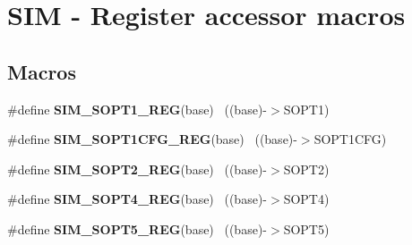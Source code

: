 \hypertarget{group___s_i_m___register___accessor___macros}{}\section{S\+I\+M -\/ Register accessor macros}
\label{group___s_i_m___register___accessor___macros}
\subsection*{Macros}
\begin{DoxyCompactItemize}
\item 
\hypertarget{group___s_i_m___register___accessor___macros_ga4fb13e9e7e8bf019daf19284be9b0a73}{}\#define {\bfseries S\+I\+M\+\_\+\+S\+O\+P\+T1\+\_\+\+R\+E\+G}(base)                                        ~((base)-\/$>$S\+O\+P\+T1)\label{group___s_i_m___register___accessor___macros_ga4fb13e9e7e8bf019daf19284be9b0a73}

\item 
\hypertarget{group___s_i_m___register___accessor___macros_ga2eac749528469c06ed7ac6d54070fdbd}{}\#define {\bfseries S\+I\+M\+\_\+\+S\+O\+P\+T1\+C\+F\+G\+\_\+\+R\+E\+G}(base)                                  ~((base)-\/$>$S\+O\+P\+T1\+C\+F\+G)\label{group___s_i_m___register___accessor___macros_ga2eac749528469c06ed7ac6d54070fdbd}

\item 
\hypertarget{group___s_i_m___register___accessor___macros_ga94d1a56cbf8d6fbebbd00363ce3cd130}{}\#define {\bfseries S\+I\+M\+\_\+\+S\+O\+P\+T2\+\_\+\+R\+E\+G}(base)                                        ~((base)-\/$>$S\+O\+P\+T2)\label{group___s_i_m___register___accessor___macros_ga94d1a56cbf8d6fbebbd00363ce3cd130}

\item 
\hypertarget{group___s_i_m___register___accessor___macros_gae47c458103d1381ff7b7f25e45338a64}{}\#define {\bfseries S\+I\+M\+\_\+\+S\+O\+P\+T4\+\_\+\+R\+E\+G}(base)                                        ~((base)-\/$>$S\+O\+P\+T4)\label{group___s_i_m___register___accessor___macros_gae47c458103d1381ff7b7f25e45338a64}

\item 
\hypertarget{group___s_i_m___register___accessor___macros_ga969ab1c02ed173435da69034770b467e}{}\#define {\bfseries S\+I\+M\+\_\+\+S\+O\+P\+T5\+\_\+\+R\+E\+G}(base)                                        ~((base)-\/$>$S\+O\+P\+T5)\label{group___s_i_m___register___accessor___macros_ga969ab1c02ed173435da69034770b467e}


\end{DoxyCompactItemize}
